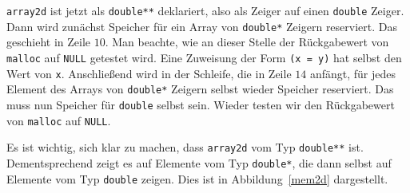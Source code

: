 \verb|array2d| ist jetzt als \verb|double**| deklariert, also als Zeiger auf einen \verb|double| Zeiger. 
Dann wird zunächst Speicher für ein Array von \verb|double*| Zeigern reserviert.
Das geschieht in Zeile $10$.
Man beachte, wie an dieser Stelle der Rückgabewert von \verb|malloc| auf \verb|NULL| getestet wird.
Eine Zuweisung der Form \verb|(x = y)| hat selbst den Wert von \verb|x|.
Anschließend wird in der Schleife, die in Zeile $14$ anfängt, für jedes Element des Arrays von \verb|double*| Zeigern selbst wieder Speicher reserviert.
Das muss nun Speicher für \verb|double| selbst sein.
Wieder testen wir den Rückgabewert von \verb|malloc| auf \verb|NULL|.

Es ist wichtig, sich klar zu machen, dass \verb|array2d| vom Typ \verb|double**| ist.
Dementsprechend zeigt es auf Elemente vom Typ \verb|double*|, die dann selbst auf Elemente vom Typ \verb|double| zeigen.
Dies ist in Abbildung~\ref{mem2d} dargestellt.

